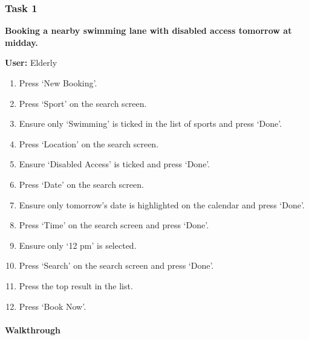 \subsubsection{Task 1}
\label{ssub:task_1}

\textbf{Booking a nearby swimming lane with disabled access tomorrow at
midday.}

\textbf{User:} Elderly
\begin{enumerate}
	\item Press `New Booking'.
	\item Press `Sport' on the search screen.
	\item Ensure only `Swimming' is ticked in the list of sports and press `Done'.
	\item Press `Location' on the search screen.
	\item Ensure `Disabled Access' is ticked and press `Done'.
	\item Press `Date' on the search screen.
	\item Ensure only tomorrow's date is highlighted on the calendar and press `Done'.
	\item Press `Time' on the search screen and press `Done'.
	\item Ensure only `12 pm' is selected.
	\item Press `Search' on the search screen and press `Done'.
	\item Press the top result in the list.
	\item Press `Book Now'.
\end{enumerate}

\paragraph{Walkthrough}


